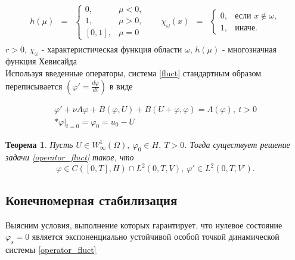 \begin{gather*}
    \begin{matrix}
        h(\mu) & =
        & \left\{
        \begin{matrix}
            0, & \mu < 0, \\
            1, & \mu > 0, \\
            [0, 1], & \mu = 0
        \end{matrix} \right.
    \end{matrix} \quad
    \begin{matrix}
        \chi_{\omega}(x) & =
        & \left\{
        \begin{matrix}
            0, & \mbox{если } x \notin \omega, \\
            1, & \mbox{иначе. }
        \end{matrix} \right.
    \end{matrix}
\end{gather*}
$r > 0$, $\chi_{\omega}$ - характеристическая функция области $\omega$,
$h(\mu)$ - многозначная функция Хевисайда\\

Используя введенные операторы, система \eqref{fluct} стандартным образом
переписывается $(\varphi' = \frac{d\varphi}{dt})$ в виде

\begin{gather}\label{operator_fluct}
    \varphi' + \nu A\varphi + B(\varphi, U) + B(U + \varphi, \varphi) =
    \Lambda(\varphi), \ t > 0 \\*
    \varphi|_{t = 0} = \varphi_0 = u_0 - U
\end{gather}

\newtheorem{theorem}{Теорема}

\begin{theorem}
     Пусть $U \in W^1_{\infty}(\Omega), \ \varphi_0 \in H, \ T > 0$. 
    Тогда существует решение задачи \eqref{operator_fluct} такое, что
    $$\varphi \in C([0, T], H) \cap L^2(0, T, V), \ \varphi' \in L^2(0, T, V').$$
\end{theorem}

\subsection{Конечномерная стабилизация}
\vspace{1em}

Выясним условия, выполнение которых гарантирует, что нулевое состояние
$\varphi_s = 0$ является экспоненциально устойчивой особой точкой динамической
системы \eqref{operator_fluct}\\

